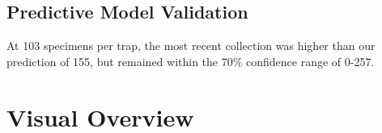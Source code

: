 \documentclass{article}
\begin{document}
\vspace{2mm}
\subsection*{Predictive Model Validation}


\begin{changemargin}{1.5cm}{1.5cm} 

At 103 specimens per trap, the most recent collection was higher than our prediction of 155, but remained within the 70\% confidence range of 0-257.  

\end{changemargin}

\hrulefill


\fancyhfoffset[E,O]{0pt}


\section*{Visual Overview}
\hrulefill
\end{document}
